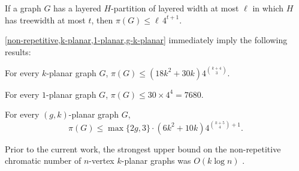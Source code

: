\documentclass{patmorin}
\newcommand{\note}[2]{{\color{red}[#1:~#2]}}
\renewcommand{\ge}{\geqslant}
\renewcommand{\le}{\leqslant}
\begin{document}

\begin{lem}
\label{non-repetitive}
If a graph $G$ has a layered $H$-partition of layered width at most $\ell$ in which $H$ has treewidth at most $t$, then $\pi(G)\le \ell\, 4^{t+1}$.
\end{lem}


\cref{non-repetitive,k-planar,1-planar,g-k-planar} immediately imply the following results:


\begin{cor}
  For every $k$-planar graph $G$, 
  $\pi(G)\le (18k^2 + 30k) 4^{\binom{k+4}{3}}$.
\end{cor}

\begin{cor}
  For every $1$-planar graph $G$, $\pi(G)\le 30\times 4^4=7680$. 
\end{cor}

\begin{cor}
  For every $(g,k)$-planar graph $G$, 
  \[ 
    \pi(G)\le \max\{2g,3\}\cdot(6k^2 + 10k) 4^{\binom{k+5}{4}+1}. 
     \]
\end{cor}



Prior to the current work, the strongest upper bound on the non-repetitive chromatic number of $n$-vertex  $k$-planar graphs was $O(k\log n)$ \cite{dujmovic.morin.ea:layered}.
\end{document}
